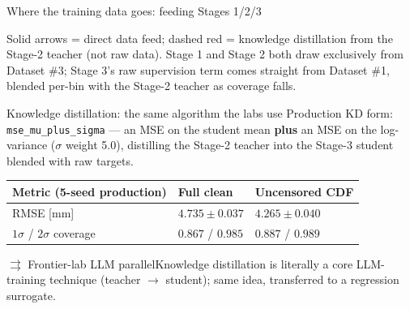 \documentclass[aspectratio=169,11pt]{beamer}
\newcommand{\good}[1]{\textcolor{goodGreen}{#1}}
\newcommand{\warn}[1]{\textcolor{warnRed}{#1}}
\newcommand{\llmparallel}[1]{%
  \begin{block}{$\rightrightarrows$ Frontier-lab LLM parallel}#1\end{block}}
\begin{document}
\begin{frame}{Where the training data goes: feeding Stages 1/2/3}
{%
}

\vspace{0.2em}
{\scriptsize Solid arrows = direct data feed; \warn{dashed red} = knowledge distillation from the Stage-2 teacher (not raw data). Stage 1 and Stage 2 both draw exclusively from Dataset \#3; Stage 3's raw supervision term comes straight from Dataset \#1, blended per-bin with the Stage-2 teacher as coverage falls.}
\end{frame}

\begin{frame}{Knowledge distillation: the same algorithm the labs use}
\small
Production KD form: \texttt{mse\_mu\_plus\_sigma} --- an MSE on the student mean
\textbf{plus} an MSE on the log-variance (\(\sigma\) weight \num{5.0}), distilling
the Stage-2 teacher into the Stage-3 student blended with raw targets.

\vspace{0.4em}
\begin{center}
\footnotesize
\renewcommand{\arraystretch}{1.1}
\begin{tabular}{@{}L{4.4cm}R{2.6cm}R{2.6cm}@{}}
\toprule
\textbf{Metric (5-seed production)} & \textbf{Full clean} & \textbf{Uncensored CDF} \\
\midrule
RMSE [mm] & \good{$4.735\pm0.037$} & \good{$4.265\pm0.040$} \\
$1\sigma$ / $2\sigma$ coverage & $0.867$ / $0.985$ & $0.887$ / $0.989$ \\
\bottomrule
\end{tabular}
\end{center}

\vspace{0.4em}
\llmparallel{Knowledge distillation is literally a core LLM-training technique
(teacher $\to$ student); same idea, transferred to a regression surrogate.}
\end{frame}
\end{document}
